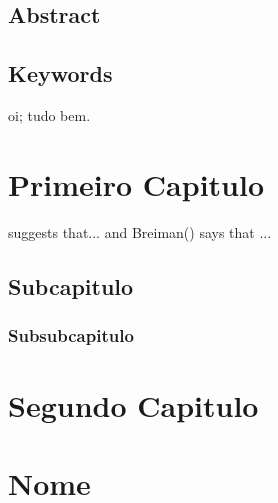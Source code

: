 \documentclass[12pt,openright,twoside,a4paper,brazil,english,emptypage,openany]{abntex2}
\makeatletter
\renewcommand{\tableofcontents}{%
  \chapter*{\MakeUppercase\contentsname}
  \@starttoc{toc}
}
\makeatother
\begin{document}
\lipsum[1]

\newpage

\section*{Abstract}
\justifying

\lipsum[1]

\vspace{4\onelineskip}
\noindent
\section*{Keywords}
\hspace{1em} oi; tudo bem.


\sffamily
\tableofcontents



\rmfamily %

\chapter{Primeiro Capitulo}
\justifying

\lipsum[1]

\cite{elliott2013complete} suggests that... and Breiman(\citeyear{elliott2013complete}) says that ...

\section{Subcapitulo}
\justifying

\lipsum[1]

\subsection{Subsubcapitulo}
\justifying

\lipsum[1]

\chapter{Segundo Capitulo}
\justifying

\lipsum[1]





\appendix

\chapter{Nome}
\justifying
\end{document}

